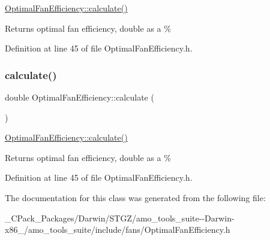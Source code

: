 \hyperlink{class_optimal_fan_efficiency_ac35291d1095c74373393ac510e45ae02}{Optimal\+Fan\+Efficiency\+::calculate()} \begin{DoxyReturn}{Returns}
optimal fan efficiency, double as a \% 
\end{DoxyReturn}


Definition at line 45 of file Optimal\+Fan\+Efficiency.\+h.

\mbox{\label{class_optimal_fan_efficiency_ac35291d1095c74373393ac510e45ae02}} 
\subsubsection{\texorpdfstring{calculate()}{calculate()}\hspace{0.1cm}{\footnotesize\ttfamily [3/3]}}
{\footnotesize\ttfamily double Optimal\+Fan\+Efficiency\+::calculate (\begin{DoxyParamCaption}{ }\end{DoxyParamCaption})\hspace{0.3cm}{\ttfamily [inline]}}

\hyperlink{class_optimal_fan_efficiency_ac35291d1095c74373393ac510e45ae02}{Optimal\+Fan\+Efficiency\+::calculate()} \begin{DoxyReturn}{Returns}
optimal fan efficiency, double as a \% 
\end{DoxyReturn}


Definition at line 45 of file Optimal\+Fan\+Efficiency.\+h.



The documentation for this class was generated from the following file\+:\begin{DoxyCompactItemize}
\item 
\+\_\+\+C\+Pack\+\_\+\+Packages/\+Darwin/\+S\+T\+G\+Z/amo\+\_\+tools\+\_\+suite-\/-\/\+Darwin-\/x86\+\_/amo\+\_\+tools\+\_\+suite/include/fans/Optimal\+Fan\+Efficiency.\+h\end{DoxyCompactItemize}
